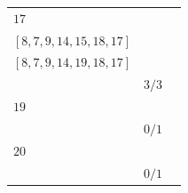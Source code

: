 \documentclass[12pt, a4paper]{extarticle}
\begin{document}
\begin{table}[h!]
\begin{tabularx}{\textwidth}{|X|X|X|}
        \hline
        $17$ & \begin{tabular}{@{}l@{}} $[8, 7, 9, 13, 15, 18, 17]$ \\  $[8, 7, 9, 14, 15, 18, 17]$ \\  $[8, 7, 9, 14, 19, 18, 17]$ \\ \end{tabular} & $3/3$ \\
        \hline
        $19$ & \begin{tabular}{@{}l@{}} $[8, 7, 9, 14, 19]$ \\ \end{tabular} & $0/1$ \\
        \hline
        $20$ & \begin{tabular}{@{}l@{}} $[8, 7, 9, 14, 19, 20]$ \\ \end{tabular} & $0/1$ \\
        \hline
    \end{tabularx}
\end{table}
\end{document}
